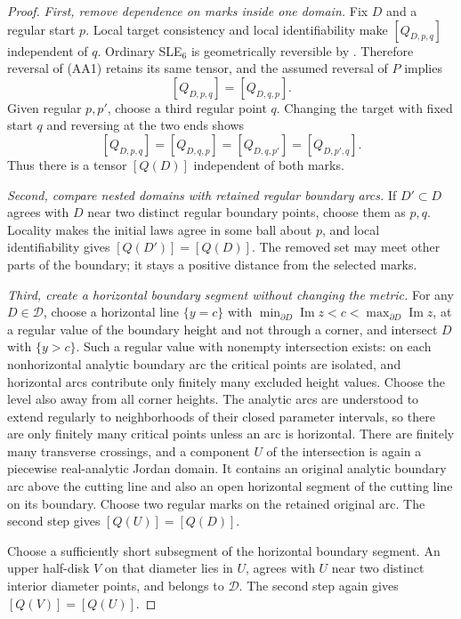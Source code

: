 \documentclass[11pt]{article}
\theoremstyle{definition}\newtheorem{definition}[theorem]{Definition}
\theoremstyle{remark}\newtheorem{remark}[theorem]{Remark}
\begin{document}
\begin{proof}
\emph{First, remove dependence on marks inside one domain.}
Fix $D$ and a regular start $p$. Local target consistency and local
identifiability make $[Q_{D,p,q}]$ independent of $q$.
Ordinary SLE$_6$ is geometrically reversible by \cite{ms}. Therefore reversal of (AA1)
retains its same tensor, and the assumed reversal of $P$ implies
\[
 [Q_{D,p,q}]=[Q_{D,q,p}].
\]
Given regular $p,p'$, choose a third regular point $q$. Changing the target
with fixed start $q$ and reversing at the two ends shows
\[
 [Q_{D,p,q}]=[Q_{D,q,p}]=[Q_{D,q,p'}]=[Q_{D,p',q}].
\]
Thus there is a tensor $[Q(D)]$ independent of both marks.

\emph{Second, compare nested domains with retained regular boundary arcs.}
If $D'\subset D$ agrees with $D$ near two distinct regular boundary points,
choose them as $p,q$. Locality makes the initial laws agree in some ball
about $p$, and local identifiability gives $[Q(D')]=[Q(D)]$.
The removed set may meet other parts of the boundary; it stays a positive
distance from the selected marks.

\emph{Third, create a horizontal boundary segment without changing the metric.}
For any $D\in\mathcal D$, choose a horizontal line $\{y=c\}$ with $\min_{\partial D}\operatorname{Im}z<c<\max_{\partial D}\operatorname{Im}z$, at a regular value of the boundary height and not through a corner, and intersect $D$ with
$\{y>c\}$. Such a regular value with nonempty intersection exists: on each nonhorizontal
analytic boundary arc the critical points are isolated, and horizontal arcs
contribute only finitely many excluded height values. Choose the level also
away from all corner heights. The analytic arcs are understood to extend
regularly to neighborhoods of their closed parameter intervals, so there
are only finitely many critical points unless an arc is horizontal.
There are finitely many transverse crossings, and a component $U$ of the
intersection is again a piecewise real-analytic Jordan domain. It contains an
original analytic boundary arc above the cutting line and also an open
horizontal segment of the cutting line on its boundary.
Choose two regular marks on the retained original arc. The second step gives
$[Q(U)]=[Q(D)]$.

Choose a sufficiently short subsegment of the horizontal boundary segment.
An upper half-disk $V$ on that diameter lies in $U$, agrees with $U$ near
two distinct interior diameter points, and belongs to $\mathcal D$.
The second step again gives $[Q(V)]=[Q(U)]$.


\end{proof}
\end{document}
